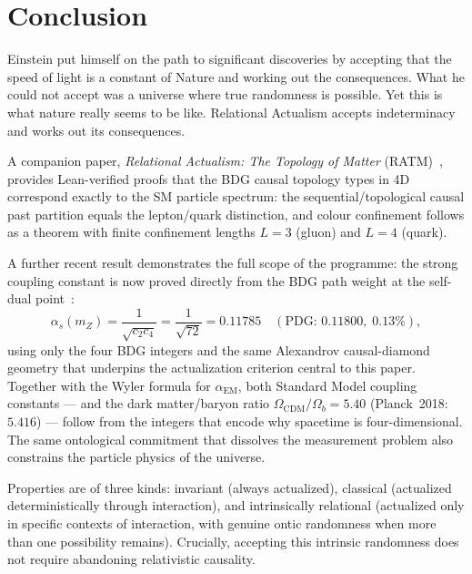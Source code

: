 \documentclass[11pt,a4paper]{article}
\theoremstyle{plain}
\theoremstyle{definition}
\theoremstyle{remark}
\begin{document}
\section{Conclusion}
\label{sec:conclusion}

Einstein put himself on the path to significant discoveries by accepting that the
speed of light is a constant of Nature and working out the consequences. What he
could not accept was a universe where true randomness is possible. Yet this is what
nature really seems to be like. Relational Actualism accepts indeterminacy and
works out its consequences.

A companion paper, \emph{Relational Actualism: The Topology of Matter}
(RATM)~\citep{Sandeman2026RATM}, provides Lean-verified proofs that the
BDG causal topology types in 4D correspond exactly to the SM particle
spectrum: the sequential/topological causal past partition equals the
lepton/quark distinction, and colour confinement follows as a theorem
with finite confinement lengths $L=3$ (gluon) and $L=4$ (quark).

A further recent result demonstrates the full scope of the programme:
the strong coupling constant is now proved directly from the BDG path weight
at the self-dual point~\citep{Sandeman2026BDG}:
\begin{equation}
  \alpha_s(m_Z) = \frac{1}{\sqrt{c_2 c_4}} = \frac{1}{\sqrt{72}} = 0.11785
  \quad (\text{PDG: } 0.11800,\; 0.13\%),
  \label{eq:alphas_raqm}
\end{equation}
using only the four BDG integers and the same Alexandrov causal-diamond
geometry that underpins the actualization criterion central to this paper.
Together with the Wyler formula for $\alpha_{\mathrm{EM}}$, both Standard
Model coupling constants --- and the dark matter/baryon ratio
$\Omega_{\mathrm{CDM}}/\Omega_b = 5.40$ (Planck~2018: $5.416$) --- follow
from the integers that encode why spacetime is four-dimensional.
The same ontological commitment that dissolves the measurement problem
also constrains the particle physics of the universe.



Properties are of three kinds: invariant (always actualized), classical (actualized
deterministically through interaction), and intrinsically relational (actualized
only in specific contexts of interaction, with genuine ontic randomness when more
than one possibility remains). Crucially, accepting this intrinsic randomness does
not require abandoning relativistic causality.
\end{document}
